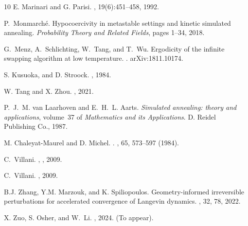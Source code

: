 \documentclass[11pt,reqno]{amsart}
\begin{document}
\begin{thebibliography}{10}
E. Marinari and G. Parisi. 
, 19(6):451–458, 1992.

P.~Monmarch{\'e}.
\newblock Hypocoercivity in metastable settings and kinetic simulated
  annealing.
\newblock \emph{Probability Theory and Related Fields}, pages 1--34, 2018.

G.~Menz, A.~Schlichting, W.~Tang, and T.~Wu.
\newblock Ergodicity of the infinite swapping algorithm at low temperature.
.
\newblock arXiv:1811.10174.

S. Kusuoka, and D. Stroock.
, 1984.


W. Tang and X. Zhou.
, 2021.

P.~J.~M. van Laarhoven and E.~H.~L. Aarts.
\newblock \emph{Simulated annealing: theory and applications}, volume~37 of
  \emph{Mathematics and its Applications}.
\newblock D. Reidel Publishing Co., 1987.

M. Chaleyat-Maurel and D. Michel.
.
,  65, 573–597 (1984).


C.~Villani.
,
, 2009.

C.~Villani.
, 2009.


B.J. Zhang, Y.M. Marzouk, and K. Spiliopoulos.
\newblock Geometry-informed irreversible perturbations for accelerated convergence of Langevin dynamics.
, 32, 78, 2022.

X. Zuo, S. Osher, and W.~Li.
, 2024. (To appear). 



\end{thebibliography}
\end{document}

